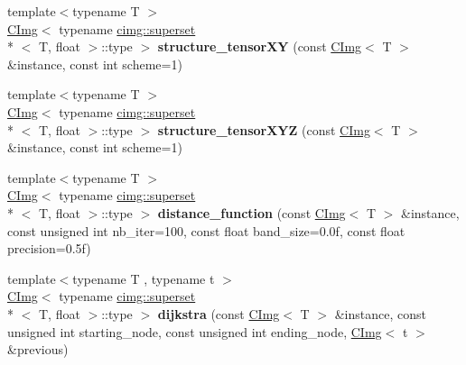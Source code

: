 \begin{DoxyCompactItemize}
\item 
\hypertarget{namespacecimg__library_a9c1d1bccbe4664f05008519ab74d8dec}{{\footnotesize template$<$typename T $>$ }\\\hyperlink{structcimg__library_1_1_c_img}{C\-Img}$<$ typename \hyperlink{structcimg__library_1_1cimg_1_1superset}{cimg\-::superset}\\*
$<$ T, float $>$\-::type $>$ {\bfseries structure\-\_\-tensor\-X\-Y} (const \hyperlink{structcimg__library_1_1_c_img}{C\-Img}$<$ T $>$ \&instance, const int scheme=1)}\label{namespacecimg__library_a9c1d1bccbe4664f05008519ab74d8dec}

\item 
\hypertarget{namespacecimg__library_a2b98089ee92143827cca8c409b4cf6c9}{{\footnotesize template$<$typename T $>$ }\\\hyperlink{structcimg__library_1_1_c_img}{C\-Img}$<$ typename \hyperlink{structcimg__library_1_1cimg_1_1superset}{cimg\-::superset}\\*
$<$ T, float $>$\-::type $>$ {\bfseries structure\-\_\-tensor\-X\-Y\-Z} (const \hyperlink{structcimg__library_1_1_c_img}{C\-Img}$<$ T $>$ \&instance, const int scheme=1)}\label{namespacecimg__library_a2b98089ee92143827cca8c409b4cf6c9}

\item 
\hypertarget{namespacecimg__library_aab0631d697568fb135aad0069e3afae8}{{\footnotesize template$<$typename T $>$ }\\\hyperlink{structcimg__library_1_1_c_img}{C\-Img}$<$ typename \hyperlink{structcimg__library_1_1cimg_1_1superset}{cimg\-::superset}\\*
$<$ T, float $>$\-::type $>$ {\bfseries distance\-\_\-function} (const \hyperlink{structcimg__library_1_1_c_img}{C\-Img}$<$ T $>$ \&instance, const unsigned int nb\-\_\-iter=100, const float band\-\_\-size=0.\-0f, const float precision=0.\-5f)}\label{namespacecimg__library_aab0631d697568fb135aad0069e3afae8}

\item 
\hypertarget{namespacecimg__library_a139f15096fa45c24a3bddb7443018b5d}{{\footnotesize template$<$typename T , typename t $>$ }\\\hyperlink{structcimg__library_1_1_c_img}{C\-Img}$<$ typename \hyperlink{structcimg__library_1_1cimg_1_1superset}{cimg\-::superset}\\*
$<$ T, float $>$\-::type $>$ {\bfseries dijkstra} (const \hyperlink{structcimg__library_1_1_c_img}{C\-Img}$<$ T $>$ \&instance, const unsigned int starting\-\_\-node, const unsigned int ending\-\_\-node, \hyperlink{structcimg__library_1_1_c_img}{C\-Img}$<$ t $>$ \&previous)}\label{namespacecimg__library_a139f15096fa45c24a3bddb7443018b5d}


\end{DoxyCompactItemize}
